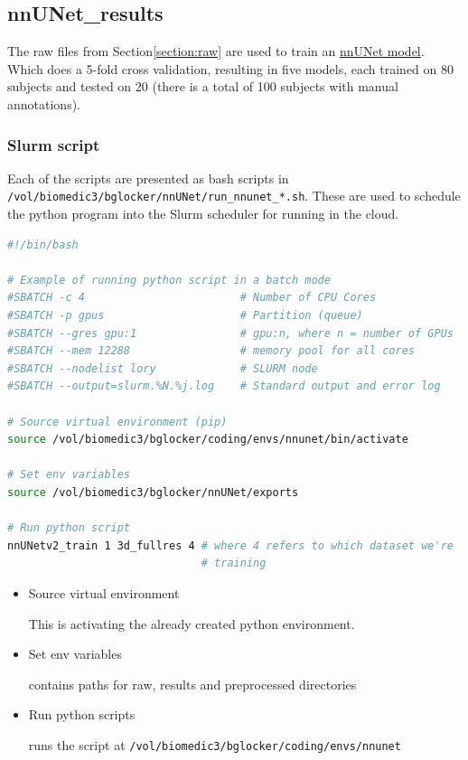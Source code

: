 \documentclass[11pt]{article}
\begin{document}
\subsection{nnUNet\_results}

The raw files from Section\ref{section:raw} are used to train an \href{https://github.com/MIC-DKFZ/nnUNet}{nnUNet model}. Which does a 5-fold cross validation, resulting in five models, each trained on 80 subjects and tested on 20 (there is a total of 100 subjects with manual annotations).

\subsubsection{Slurm script}

Each of the scripts are presented as bash scripts in \texttt{/vol/biomedic3/bglocker/nnUNet/run\_nnunet\_*.sh}. These are used to schedule the python program into the Slurm scheduler for running in the cloud.

\begin{lstlisting}[language=bash]
#!/bin/bash

# Example of running python script in a batch mode
#SBATCH -c 4                        # Number of CPU Cores
#SBATCH -p gpus                     # Partition (queue)
#SBATCH --gres gpu:1                # gpu:n, where n = number of GPUs
#SBATCH --mem 12288                 # memory pool for all cores
#SBATCH --nodelist lory          	# SLURM node
#SBATCH --output=slurm.%N.%j.log    # Standard output and error log

# Source virtual environment (pip)
source /vol/biomedic3/bglocker/coding/envs/nnunet/bin/activate

# Set env variables
source /vol/biomedic3/bglocker/nnUNet/exports

# Run python script
nnUNetv2_train 1 3d_fullres 4 # where 4 refers to which dataset we're 
                              # training
\end{lstlisting}

\begin{itemize}
    \item Source virtual environment
    
    This is activating the already created python environment. 

    \item Set env variables
    
    contains paths for raw, results and preprocessed directories

    \item Run python scripts 
    
    runs the script at \texttt{/vol/biomedic3/bglocker/coding/envs/nnunet}
\end{itemize}
\end{document}
